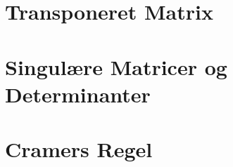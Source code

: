 \section{Transponeret Matrix}


\section{Singulære Matricer og Determinanter}



\section{Cramers Regel}



